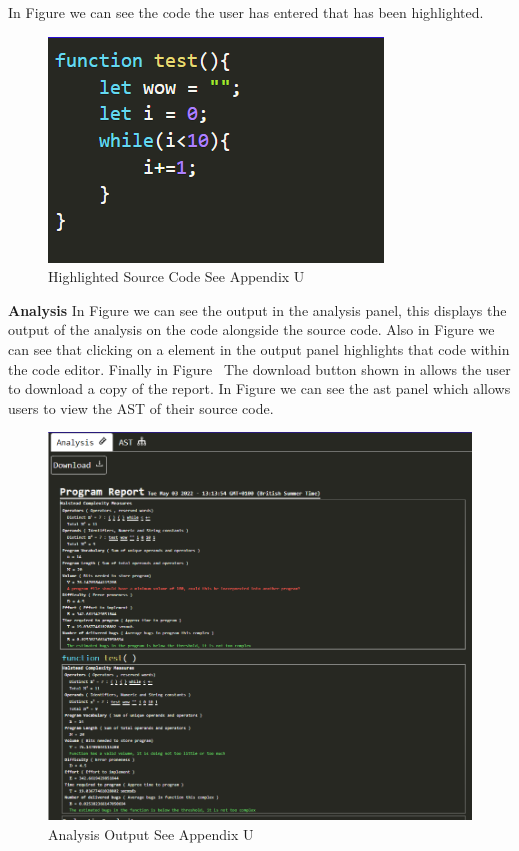 In Figure  we can see the code the user has entered that has been highlighted.
\begin{figure}[h]
    \includegraphics[width=.3\textwidth]{images/Highlighted.png}
    \caption{Highlighted Source Code See Appendix U}
    \label{fig:Highliting}
\end{figure}
\newline
\newline
\textbf{Analysis}
\newline
In Figure  we can see the output in the analysis panel, this displays the output of the analysis on the code alongside the 
source code. Also in Figure  we can see that clicking on a element in the output panel highlights that code within the code editor. Finally in Figure \
The download button shown in  allows the user to download a copy of the report.
\newline
In Figure  we can see the ast panel which allows users to view the AST of their source code.
\begin{figure}[h]
    \includegraphics[width=.5\textwidth]{images/analysisoutput.png}
    \caption{Analysis Output See Appendix U}
    \label{fig:output}
\end{figure}

